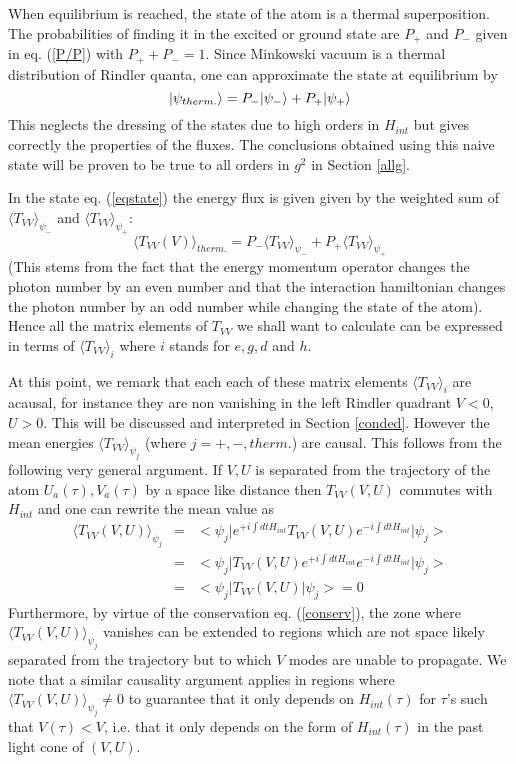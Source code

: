 \documentclass[12pt]{article}
\begin{document}
When equilibrium is reached, the state of the atom is a thermal
superposition. The probabilities of finding it in the excited or
ground state are $P_+$ and $P_-$ given in eq. (\ref{P/P}) with
$P_++P_-=1$.
Since Minkowski vacuum is a thermal distribution of Rindler quanta, one
can approximate the state at equilibrium by
\begin{equation}
\mbox{$ \vert \psi_{therm.} \rangle $} = P_- \mbox{$ \vert \psi_- \rangle $} + P_+ \mbox{$ \vert \psi_+ \rangle $}
\label{eqstate}
\end{equation}
This neglects the dressing of the states due to high orders in $H_{int}$
but gives correctly the properties of the fluxes. The
conclusions obtained using this naive state will be proven to be true to all
orders in $g^2$ in Section \ref{allg}.

In the state eq. (\ref{eqstate}) the energy flux is given given by the weighted
sum of
$\langle T_{VV}\rangle _{\psi_-}$ and $\langle T_{VV}\rangle _{\psi_+}$:
\begin{equation}
\langle T_{VV}(V)\rangle _{therm.} =
P_-
\langle T_{VV}\rangle _{\psi_-}
+ P_+
\langle T_{VV}\rangle _{\psi_+}
\label{eqT}
\end{equation}
(This stems from the fact that
the energy momentum operator changes the photon number by an even number and
that the interaction hamiltonian changes the photon number by an odd number
while changing the state of the atom).
Hence all the matrix elements of $T_{VV}$ we shall want to calculate can be
expressed in terms of $\langle T_{VV}\rangle _i$ where $i$ stands
for
$e,
g,
d$ and $h$.

At this point, we remark that
each each of these matrix elements $\langle T_{VV}\rangle _i$
are acausal, for instance they are non vanishing in the left Rindler quadrant
$V<0$,
$U>0$. This will be discussed and interpreted in Section \ref{conded}.
 However the
mean  energies
$\langle T_{VV}\rangle _{\psi_j}$
(where $j= +,-,therm.$) are causal. This follows from the following very
general
argument\cite{UnWa}. If $V,U$ is separated from the trajectory of the
atom $U_a(\tau),
V_a(\tau)$
by a space like distance then $T_{VV}(V,U)$ commutes with $H_{int}$
and one can
rewrite
the mean value as
\begin{eqnarray}
\langle T_{VV}(V,U) \rangle_{\psi_j} &=&
< \psi_j \vert e^{+i\int dt H_{int}} T_{VV}(V,U) e^{-i\int dt
H_{int}}\vert\psi_j > \nonumber\\
&=& < \psi_j \vert  T_{VV}(V,U) e^{+i\int dt H_{int}}e^{-i\int dt
H_{int}}\vert\psi_j > \nonumber\\
&=& < \psi_j \vert  T_{VV}(V,U) \vert\psi_j > =0
\label{van}
\end{eqnarray}
Furthermore, by virtue of  the conservation eq. (\ref{conserv}), the
 zone where $\langle T_{VV}(V,U)
\rangle_{\psi_j}$ vanishes
can be extended to regions which are not space likely
separated
from
the trajectory but to which $V$ modes are unable to propagate.
We note that a  similar causality argument applies in regions where $\langle
T_{VV}(V,U)
\rangle_{\psi_j} \neq 0$ to guarantee that it only depends on $H_{int}(\tau)$
for $\tau$'s
such
that
$V(\tau) < V$, i.e. that it only depends on the form of $H_{int}(\tau)$ in the
past
light
cone of $(V,U)$.
\end{document}
